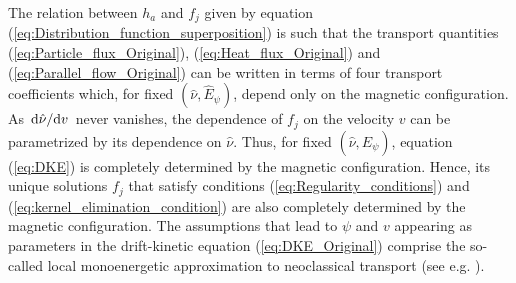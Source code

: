 \documentclass[10pt]{iopart}
\begin{document}
The relation between $h_a$ and $f_j$ given by equation (\ref{eq:Distribution_function_superposition}) is such that the transport quantities (\ref{eq:Particle_flux_Original}), (\ref{eq:Heat_flux_Original}) and (\ref{eq:Parallel_flow_Original}) can be written in terms of four transport coefficients which, for fixed $(\hat{\nu}, \widehat{E}_\psi)$, depend only on the magnetic configuration. As $\dv*{\hat{\nu}}{v}$ never vanishes, the dependence of $f_j$ on the velocity $v$ can be parametrized by its dependence on $\hat{\nu}$. Thus, for fixed $(\hat{\nu}, \widehat{E}_\psi)$, equation (\ref{eq:DKE}) is completely determined by the magnetic configuration. Hence, its unique solutions $f_j$ that satisfy conditions (\ref{eq:Regularity_conditions}) and (\ref{eq:kernel_elimination_condition}) are also completely determined by the magnetic configuration. The assumptions that lead to $\psi$ and $v$ appearing as parameters in the drift-kinetic equation (\ref{eq:DKE_Original}) comprise the so-called local monoenergetic approximation to neoclassical transport (see e.g. \cite{Landreman_Monoenergetic}).
\end{document}

